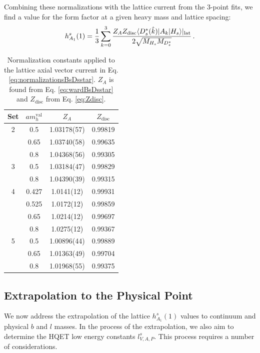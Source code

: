 Combining these normalizations with the lattice current from the 3-point fits, we find a value for the form factor at a given heavy mass and lattice spacing:
\begin{align}
  h_{A_1}^s(1) = {1\over 3} \sum_{k=0}^3 { Z_A Z_{\text{disc}}\langle D_s^*(\hat{k}) | A_k | H_s \rangle |_{\text{lat}}\over 2\sqrt{M_{H_s} M_{D_s^*}} }\,.
  \label{eq:normalizationsBsDsstar}
\end{align}

\begin{table}
\begin{center}
\begin{tabular}{ c c c c }
\hline
Set & $am_h^{\text{val}}$ & $Z_A$& $Z_{\text{disc}}$\\ [0.5ex]
\hline
2 & 0.5 & 1.03178(57) & 0.99819\\ [0.5ex] 
 & 0.65 & 1.03740(58) & 0.99635\\ [0.5ex] 
 & 0.8 & 1.04368(56) & 0.99305\\ [0.5ex] 
\hline
3 & 0.5 & 1.03184(47) & 0.99829\\ [0.5ex] 
 & 0.8 & 1.04390(39) & 0.99315\\ [0.5ex] 
\hline
4 & 0.427 & 1.0141(12) & 0.99931\\ [0.5ex] 
 & 0.525 & 1.0172(12) & 0.99859\\ [0.5ex] 
 & 0.65 & 1.0214(12) & 0.99697\\ [0.5ex] 
 & 0.8 & 1.0275(12) & 0.99367\\ [0.5ex] 
\hline
5 & 0.5 & 1.00896(44) & 0.99889\\ [0.5ex] 
 & 0.65 & 1.01363(49) & 0.99704\\ [0.5ex] 
 & 0.8 & 1.01968(55) & 0.99375\\ [0.5ex] 
\hline
\end{tabular}
\caption{Normalization constants applied to the lattice axial vector current in Eq. \eqref{eq:normalizationsBsDsstar}. $Z_A$ is found from Eq. \eqref{eq:wardBsDsstar} and $Z_{\text{disc}}$ from Eq. \eqref{eq:Zdisc}. \label{tab:norms}}
\end{center}
\end{table}


\subsection{Extrapolation to the Physical Point}
\label{sec:BsDsstar_extrapolation}

We now address the extrapolation of the lattice $h_{A_1}^s(1)$ values to continuum and physical $b$ and $l$ masses. In the process of the extrapolation, we also aim to determine the HQET low energy constants $l^s_{V,A,P}$. This process requires a number of considerations.

